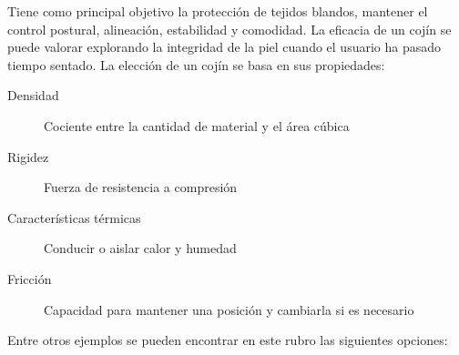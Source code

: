 Tiene como principal objetivo la protecci\'on de tejidos blandos, mantener el
control postural, alineaci\'on, estabilidad y comodidad. La eficacia de un
coj\'in se puede valorar explorando la integridad de la piel cuando el usuario
ha pasado tiempo sentado. La elecci\'on de un coj\'in se basa en sus
propiedades:
\begin{description}
    \item[Densidad] Cociente entre la cantidad de material y el \'area c\'ubica
    \item[Rigidez] Fuerza de resistencia a compresi\'on
    \item[Caracter\'isticas t\'ermicas] Conducir o aislar calor y humedad
    \item[Fricci\'on] Capacidad para mantener una posici\'on y cambiarla si es
        necesario
\end{description}
Entre otros ejemplos se pueden encontrar en este rubro las siguientes opciones:
